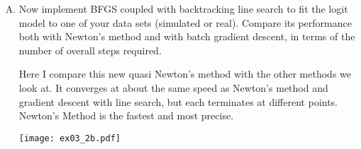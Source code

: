 \documentclass{article}
\begin{document}
\begin{enumerate}[(A)]
\item Now implement BFGS coupled with backtracking line search to fit the logit model to one of your data sets (simulated or real).  Compare its performance both with Newton's method and with batch gradient descent, in terms of the number of overall steps required.

\color{blue}
Here I compare this new quasi Newton's method with the other methods we look at. It converges at about the same speed as Newton's method and gradient descent with line search, but each terminates at different points. Newton's Method is the fastest and most precise. 
\begin{center}
\texttt{[image: ex03\_2b.pdf]}
\end{center}
\color{black}

\end{enumerate}
\end{document}
